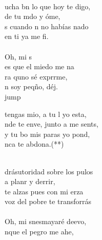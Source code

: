 \begin{cancion}%
	    \\
	ucha bn lo que hoy te digo,\\
	 de tu mdo y óme, \\
	s cuando n no habías nado \\
	 en ti ya me fi. \\
	\jump\\
	Oh, mi s\\
	es que el miedo me na\\
	ra quno sé exprrme,\\
	n soy peqño, déj. \\jump\\
	\begin{chorus}%
	 tengas mio, a tu l yo esta,\\
	nde te enve, junto a me sents, \\
	y  tu bo mis paras yo pond,\\
	nca te abdona.(**)\\
	\end{chorus}%
	\jump\\
	drásutoridad sobre los pulos\\
	a planr y derrir,\\
	 te alzas pues con mi erza \\
	 voz del pobre te transforrás\\
	\jump\\
	Oh, mi snesmayaré deevo,\\
	nque el pegro me ahe,\\

\end{cancion}
